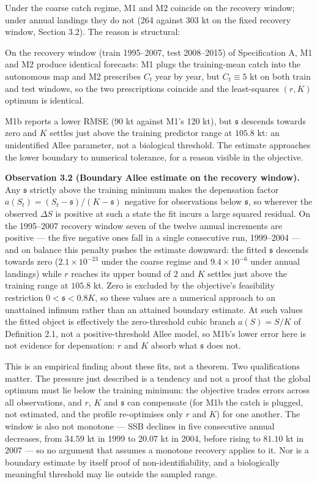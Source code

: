 \documentclass[11pt]{article}
\begin{document}
Under the coarse catch regime, M1 and M2 coincide on the recovery
window; under annual landings they do not (264 against 303 kt on the fixed recovery window, Section 3.2). The reason is structural:

On the recovery window (train 1995--2007, test 2008--2015) of
Specification A, M1 and M2 produce identical forecasts: M1 plugs the
training-mean catch into the autonomous map and M2 prescribes \(C_t\)
year by year, but \(C_t\equiv 5\) kt on both train and test windows, so
the two prescriptions coincide and the least-squares \((r,K)\) optimum is
identical.

M1b reports a lower RMSE (90 kt against M1's 120 kt), but
\(\mathfrak s\) descends towards zero and \(K\) settles just above the
training predictor range at \(105.8\) kt: an
unidentified Allee parameter, not a biological threshold. The estimate
approaches the lower boundary to numerical tolerance, for a reason visible in the objective.

\textbf{Observation 3.2 (Boundary Allee estimate on the recovery
window).} Any \(\mathfrak s\) strictly above the training minimum makes
the depensation factor
\(a(S_t)=(S_t-\mathfrak s)/(K-\mathfrak s)\) negative for observations
below \(\mathfrak s\), so wherever the observed \(\Delta S\) is positive
at such a state the fit incurs a large squared residual. On the
1995--2007 recovery window seven of the twelve annual increments are
positive --- the five negative ones fall in a single consecutive run,
1999--2004 --- and on balance this penalty pushes the estimate downward: the fitted \(\mathfrak s\)
descends towards zero (\(2.1\times10^{-23}\) under the coarse regime and
\(9.4\times10^{-6}\) under annual landings) while \(r\) reaches its
upper bound of \(2\) and \(K\) settles just above the training range at
\(105.8\) kt. Zero is excluded by the objective's feasibility
restriction \(0 < \mathfrak s < 0.8K\), so these values are a numerical
approach to an unattained infimum rather than an attained boundary
estimate. At such values the fitted object is effectively the
zero-threshold cubic branch \(a(S)=S/K\) of Definition 2.1, not a
positive-threshold Allee model, so M1b's lower error here is not
evidence for depensation: \(r\) and \(K\) absorb what \(\mathfrak s\)
does not.

This is an empirical finding about these fits, not a theorem. Two qualifications matter. The pressure just
described is a tendency and not a proof that the global optimum must lie
below the training minimum: the objective trades errors across all
observations, and \(r\), \(K\) and \(\mathfrak s\) can compensate (for M1b the catch is
plugged, not estimated, and the profile re-optimises only \(r\) and
\(K\))
for one another. The window is also not monotone --- SSB declines in
five consecutive annual decreases, from \(34.59\) kt in 1999 to
\(20.07\) kt in 2004, before rising to \(81.10\) kt in 2007 --- so no argument that
assumes a monotone recovery applies to it. Nor is a boundary estimate by
itself proof of non-identifiability, and a biologically meaningful
threshold may lie outside the sampled range.
\end{document}
